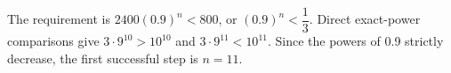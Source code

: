 The requirement is $2400(0.9)^n<800$, or $(0.9)^n<\dfrac{1}{3}$. Direct exact-power comparisons give $3\cdot9^{10}>10^{10}$ and $3\cdot9^{11}<10^{11}$. Since the powers of 0.9 strictly decrease, the first successful step is $\boxed{n=11}$.
